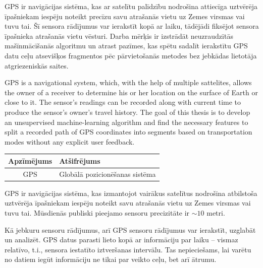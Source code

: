 \documentclass{ludis}
\begin{document}
\maketitle

\begin{abstract-lv}
  GPS ir navigācijas sistēma, kas ar satelītu palīdzību nodrošina attiecīga uztvērēja īpašniekam
  iespēju noteikt precīzu savu atrašanās vietu uz Zemes virsmas vai tuvu tai. Šī sensora rādījumus
  var ierakstīt kopā ar laiku, tādējādi fiksējot sensora īpašnieka atrašanās vietu vēsturi.
  Darba mērķis ir izstrādāt neuzraudzītās mašīnmācīšanās algoritmu un atrast pazīmes, kas spētu
  sadalīt ierakstītu GPS datu ceļu atsevišķos fragmentos pēc pārvietošanās metodes bez jebkādas 
  lietotāja atgriezeniskās saites.
\end{abstract-lv}

\begin{abstract-en}
  GPS is a navigational system, which, with the help of multiple sattelites, allows the owner
  of a receiver to determine his or her location on the surface of Earth or close to it. The
  sensor's readings can be recorded along with current time to produce the sensor's owner's 
  travel history.
  The goal of this thesis is to develop an unsupervised machine-learning algorithm and find the 
  necessary features to split a recorded path of GPS coordinates into segments based on
  transportation modes without any explicit user feedback.
\end{abstract-en}

\tableofcontents

\setlength\LTleft{0pt}
\setlength\LTright{0pt}
\begin{longtable}{| c | p{28em} |}
  \hline
  \textbf{Apzīmējums} & \textbf{Atšifrējums}\\ 
  \endhead
  \hline
  GPS & Globālā pozicionēšanas sistēma\\
  \hline
\end{longtable}

GPS ir navigācijas sistēma, kas izmantojot vairākus satelītus nodrošina atbilstoša uztvērēja 
īpašniekam iespēju noteikt savu atrašanās vietu uz Zemes virsmas vai tuvu tai. Mūsdienās
publiski pieejamo sensoru precizitāte ir $\sim 10$ metri. 

Kā jebkuru sensoru rādījumus, arī GPS sensoru rādījumus var ierakstīt, uzglabāt un analizēt. GPS
datus parasti lieto kopā ar informāciju par laiku -- vismaz relatīvo, t.i., sensora iestatīto
iztveršanas intervālu. Tas nepieciešams, lai varētu no datiem iegūt informāciju ne tikai par 
veikto ceļu, bet arī ātrumu.
\end{document}
